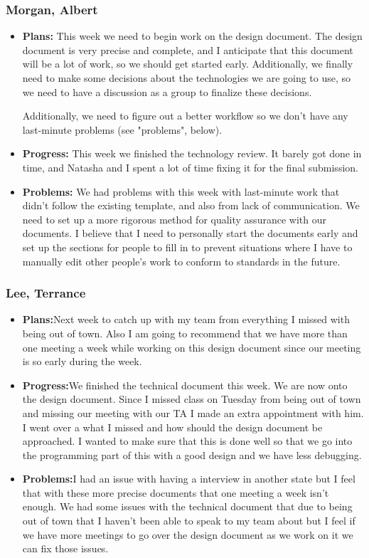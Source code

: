 \documentclass[10pt,draftclsnofoot,onecolumn]{IEEEtran}
\begin{document}
\subsubsection{Morgan, Albert}
\begin{itemize}
	\item \textbf{Plans: }
	This week we need to begin work on the design document. The design document is very precise and complete, and I anticipate that this document will be a lot of work, so we should get started early. Additionally, we finally need to make some decisions about the technologies we are going to use, so we need to have a discussion as a group to finalize these decisions.
	
	Additionally, we need to figure out a better workflow so we don't have any last-minute problems (see "problems", below).
	\item \textbf{Progress: }
	This week we finished the technology review. It barely got done in time, and Natasha and I spent a lot of time fixing it for the final submission.
	\item \textbf{Problems: }
	We had problems with this week with last-minute work that didn't follow the existing template, and also from lack of communication. We need to set up a more rigorous method for quality assurance with our documents. I believe that I need to personally start the documents early and set up the sections for people to fill in to prevent situations where I have to manually edit other people's work to conform to standards in the future.
\end{itemize}
\subsubsection{Lee, Terrance}
\begin{itemize}
	\item \textbf{Plans:}Next week to catch up with my team from everything I missed with being out of town. Also I am going to recommend that we have more than one meeting a week while working on this design document since our meeting is so early during the week.
	\item \textbf{Progress:}We finished the technical document this week. We are now onto the design document. Since I missed class on Tuesday from being out of town and missing our meeting with our TA I made an extra appointment with him. I went over a what I missed and how should the design document be approached. I wanted to make sure that this is done well so that we go into the programming part of this with a good design and we have less debugging.
	\item \textbf{Problems:}I had an issue with having a interview in another state but I feel that with these more precise documents that one meeting a week isn't enough. We had some issues with the technical document that due to being out of town that I haven't been able to speak to my team about but I feel if we have more meetings to go over the design document as we work on it we can fix those issues.
\end{itemize}
\end{document}
